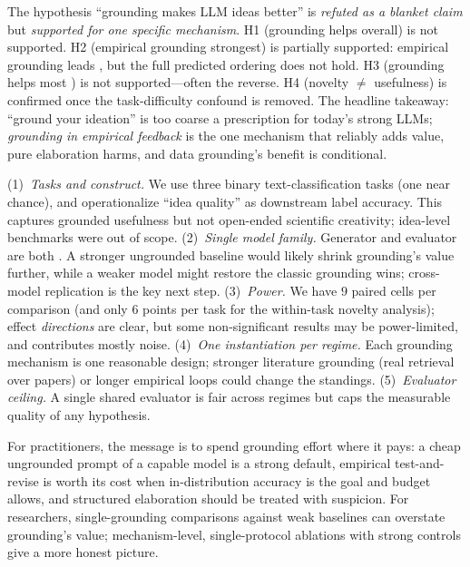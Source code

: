  The hypothesis ``grounding makes LLM ideas better''
is \emph{refuted as a blanket claim} but \emph{supported for one specific mechanism}.
H1 (grounding helps overall) is not supported. H2 (empirical grounding strongest) is
partially supported: empirical grounding leads \IND, but the full predicted ordering
does not hold. H3 (grounding helps most \OOD) is not supported---often the reverse.
H4 (novelty $\neq$ usefulness) is confirmed once the task-difficulty confound is
removed. The headline takeaway: ``ground your ideation'' is too coarse a prescription
for today's strong LLMs; \emph{grounding in empirical feedback} is the one mechanism
that reliably adds value, pure elaboration harms, and data grounding's benefit is
conditional.

 (1)~\emph{Tasks and construct.} We use three binary text-classification
tasks (one near chance), and operationalize ``idea quality'' as downstream label
accuracy. This captures grounded usefulness but not open-ended scientific
creativity; idea-level benchmarks were out of scope. (2)~\emph{Single model family.}
Generator and evaluator are both \gptmini. A stronger ungrounded baseline would
likely shrink grounding's value further, while a weaker model might restore the
classic grounding wins; cross-model replication is the key next step.
(3)~\emph{Power.} We have $9$ paired cells per comparison (and only $6$ points per
task for the within-task novelty analysis); effect \emph{directions} are clear, but
some non-significant results may be power-limited, and \headline{} contributes mostly
noise. (4)~\emph{One instantiation per regime.} Each grounding mechanism is one
reasonable design; stronger literature grounding (real retrieval over papers) or
longer empirical loops could change the standings. (5)~\emph{Evaluator ceiling.} A
single shared evaluator is fair across regimes but caps the measurable quality of any
hypothesis.

 For practitioners, the message is to spend grounding
effort where it pays: a cheap ungrounded prompt of a capable model is a strong
default, empirical test-and-revise is worth its cost when in-distribution accuracy is
the goal and budget allows, and structured elaboration should be treated with
suspicion. For researchers, single-grounding comparisons against weak baselines can
overstate grounding's value; mechanism-level, single-protocol ablations with strong
controls give a more honest picture.
